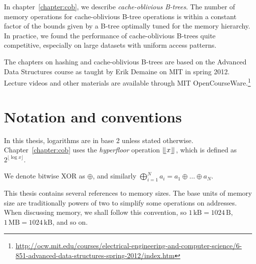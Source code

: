 In chapter~\ref{chapter:cob}, we describe \emph{cache-oblivious B-trees}.
The number of memory operations for cache-oblivious B-tree operations
is within a constant factor of the bounds given by a B-tree optimally tuned
for the memory hierarchy. In practice, we found the performance of
cache-oblivious B-trees quite competitive, especially on large datasets
with uniform access patterns.

The chapters on hashing and cache-oblivious B-trees are based on the Advanced
Data Structures course as taught by Erik Demaine on MIT in spring 2012.
Lecture videos and other materials are available through MIT OpenCourseWare.\footnote{%
\url{http://ocw.mit.edu/courses/electrical-engineering-and-computer-science/6-851-advanced-data-structures-spring-2012/index.htm}}

\section*{Notation and conventions}
In this thesis, logarithms are in base 2 unless stated otherwise.
Chapter~\ref{chapter:cob} uses the \emph{hyperfloor} operation
$\lfloor \kern -0.22em \lfloor x\rfloor \kern -0.22em \rfloor$, which is defined as $2^{\lfloor\log x\rfloor}$.

We denote bitwise XOR as $\oplus$, and similarly $\bigoplus_{i=1}^N
a_i=a_1\oplus\ldots\oplus a_N$.

This thesis contains several references to memory sizes. The base units of
memory size are traditionally powers of two to simplify some operations on
addresses.
When discussing memory, we shall follow this convention, so
$1\,\mathrm{kB}=1024\,\mathrm{B}$, $1\,\mathrm{MB}=1024\,\mathrm{kB}$,
and so on.

